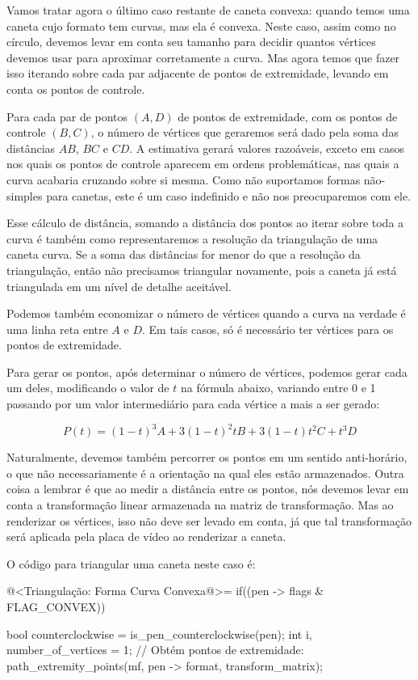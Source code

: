{{{{{{Vamos tratar agora o último caso restante de caneta convexa: quando
temos uma caneta cujo formato tem curvas, mas ela é convexa. Neste
caso, assim como no círculo, devemos levar em conta seu tamanho para
decidir quantos vértices devemos usar para aproximar corretamente a
curva. Mas agora temos que fazer isso iterando sobre cada par
adjacente de pontos de extremidade, levando em conta os pontos de
controle.

Para cada par de pontos $(A, D)$ de pontos de extremidade, com os
pontos de controle $(B, C)$, o número de vértices que geraremos será
dado pela soma das distâncias $AB$, $BC$ e $CD$. A estimativa gerará
valores razoáveis, exceto em casos nos quais os pontos de controle
aparecem em ordens problemáticas, nas quais a curva acabaria cruzando
sobre si mesma. Como não suportamos formas não-simples para canetas,
este é um caso indefinido e não nos preocuparemos com ele.

Esse cálculo de distância, somando a distância dos pontos ao iterar
sobre toda a curva é também como representaremos a resolução da
triangulação de uma caneta curva. Se a soma das distâncias for menor
do que a resolução da triangulação, então não precisamos triangular
novamente, pois a caneta já está triangulada em um nível de detalhe
aceitável.

Podemos também economizar o número de vértices quando a curva na
verdade é uma linha reta entre $A$ e $D$. Em tais casos, só é
necessário ter vértices para os pontos de extremidade.

Para gerar os pontos, após determinar o número de vértices, podemos
gerar cada um deles, modificando o valor de $t$ na fórmula abaixo,
variando entre 0 e 1 passando por um valor intermediário para cada
vértice a mais a ser gerado:

$$
P(t) = (1-t)^3A + 3(1-t)^2tB + 3(1-t)t^2C + t^3D
$$

Naturalmente, devemos também percorrer os pontos em um sentido
anti-horário, o que não necessariamente é a orientação na qual eles
estão armazenados. Outra coisa a lembrar é que ao medir a distância
entre os pontos, nós devemos levar em conta a transformação linear
armazenada na matriz de transformação. Mas ao renderizar os vértices,
isso não deve ser levado em conta, já que tal transformação será
aplicada pela placa de vídeo ao renderizar a caneta.

O código para triangular uma caneta neste caso é:

\iniciocodigo
@<Triangulação: Forma Curva Convexa@>=
if((pen -> flags & FLAG_CONVEX)){
  bool counterclockwise = is_pen_counterclockwise(pen);
  int i, number_of_vertices = 1;
  // Obtém pontos de extremidade:
  path_extremity_points(mf, pen -> format, transform_matrix);


}}}}}}}

